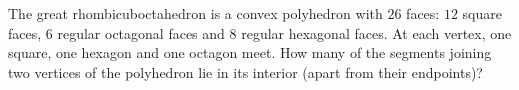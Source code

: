 The great rhombicuboctahedron is a convex polyhedron with $26$ faces: $12$ square faces, $6$ regular octagonal faces and $8$ regular hexagonal faces. At each vertex, one square, one hexagon and one octagon meet. How many of the segments joining two vertices of the polyhedron lie in its interior (apart from their endpoints)?
